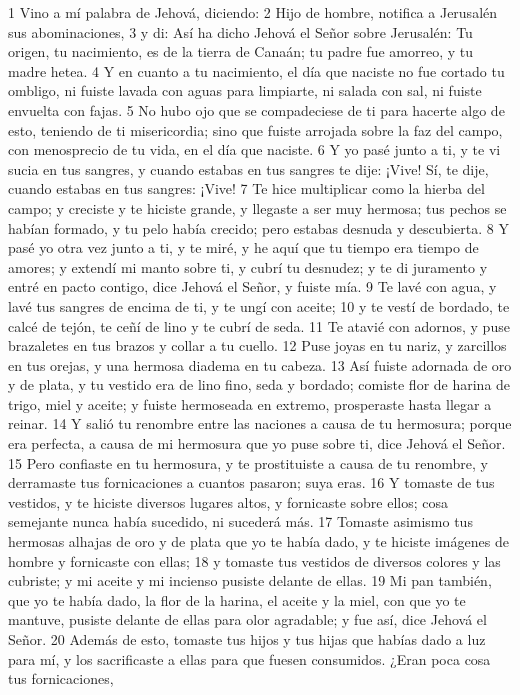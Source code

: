 1 Vino a mí palabra de Jehová, diciendo:
2 Hijo de hombre, notifica a Jerusalén sus abominaciones,
3 y di: Así ha dicho Jehová el Señor sobre Jerusalén: Tu origen, tu nacimiento, es de la tierra de Canaán; tu padre fue amorreo, y tu madre hetea.
4 Y en cuanto a tu nacimiento, el día que naciste no fue cortado tu ombligo, ni fuiste lavada con aguas para limpiarte, ni salada con sal, ni fuiste envuelta con fajas.
5 No hubo ojo que se compadeciese de ti para hacerte algo de esto, teniendo de ti misericordia; sino que fuiste arrojada sobre la faz del campo, con menosprecio de tu vida, en el día que naciste.
6 Y yo pasé junto a ti, y te vi sucia en tus sangres, y cuando estabas en tus sangres te dije: ¡Vive! Sí, te dije, cuando estabas en tus sangres: ¡Vive!
7 Te hice multiplicar como la hierba del campo; y creciste y te hiciste grande, y llegaste a ser muy hermosa; tus pechos se habían formado, y tu pelo había crecido; pero estabas desnuda y descubierta.
8 Y pasé yo otra vez junto a ti, y te miré, y he aquí que tu tiempo era tiempo de amores; y extendí mi manto sobre ti, y cubrí tu desnudez; y te di juramento y entré en pacto contigo, dice Jehová el Señor, y fuiste mía.
9 Te lavé con agua, y lavé tus sangres de encima de ti, y te ungí con aceite;
10 y te vestí de bordado, te calcé de tejón, te ceñí de lino y te cubrí de seda.
11 Te atavié con adornos, y puse brazaletes en tus brazos y collar a tu cuello.
12 Puse joyas en tu nariz, y zarcillos en tus orejas, y una hermosa diadema en tu cabeza.
13 Así fuiste adornada de oro y de plata, y tu vestido era de lino fino, seda y bordado; comiste flor de harina de trigo, miel y aceite; y fuiste hermoseada en extremo, prosperaste hasta llegar a reinar.
14 Y salió tu renombre entre las naciones a causa de tu hermosura; porque era perfecta, a causa de mi hermosura que yo puse sobre ti, dice Jehová el Señor.
15 Pero confiaste en tu hermosura, y te prostituiste a causa de tu renombre, y derramaste tus fornicaciones a cuantos pasaron; suya eras.
16 Y tomaste de tus vestidos, y te hiciste diversos lugares altos, y fornicaste sobre ellos; cosa semejante nunca había sucedido, ni sucederá más.
17 Tomaste asimismo tus hermosas alhajas de oro y de plata que yo te había dado, y te hiciste imágenes de hombre y fornicaste con ellas;
18 y tomaste tus vestidos de diversos colores y las cubriste; y mi aceite y mi incienso pusiste delante de ellas.
19 Mi pan también, que yo te había dado, la flor de la harina, el aceite y la miel, con que yo te mantuve, pusiste delante de ellas para olor agradable; y fue así, dice Jehová el Señor.
20 Además de esto, tomaste tus hijos y tus hijas que habías dado a luz para mí, y los sacrificaste a ellas para que fuesen consumidos. ¿Eran poca cosa tus fornicaciones,
